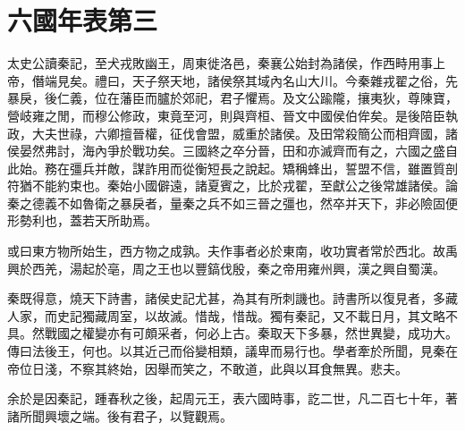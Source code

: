 \onecolumn
\chapter{六國年表第三}

太史公讀秦記，至犬戎敗幽王，周東徙洛邑，秦襄公始封為諸侯，作西畤用事上帝，僭端見矣。禮曰，天子祭天地，諸侯祭其域內名山大川。今秦雜戎翟之俗，先暴戾，後仁義，位在藩臣而臚於郊祀，君子懼焉。及文公踰隴，攘夷狄，尊陳寶，營岐雍之閒，而穆公修政，東竟至河，則與齊桓、晉文中國侯伯侔矣。是後陪臣執政，大夫世祿，六卿擅晉權，征伐會盟，威重於諸侯。及田常殺簡公而相齊國，諸侯晏然弗討，海內爭於戰功矣。三國終之卒分晉，田和亦滅齊而有之，六國之盛自此始。務在彊兵并敵，謀詐用而從衡短長之說起。矯稱蜂出，誓盟不信，雖置質剖符猶不能約束也。秦始小國僻遠，諸夏賓之，比於戎翟，至獻公之後常雄諸侯。論秦之德義不如魯衛之暴戾者，量秦之兵不如三晉之彊也，然卒并天下，非必險固便形勢利也，蓋若天所助焉。
	
或曰東方物所始生，西方物之成孰。夫作事者必於東南，收功實者常於西北。故禹興於西羌，湯起於亳，周之王也以豐鎬伐殷，秦之帝用雍州興，漢之興自蜀漢。

秦既得意，燒天下詩書，諸侯史記尤甚，為其有所刺譏也。詩書所以復見者，多藏人家，而史記獨藏周室，以故滅。惜哉，惜哉。獨有秦記，又不載日月，其文略不具。然戰國之權變亦有可頗采者，何必上古。秦取天下多暴，然世異變，成功大。傳曰法後王，何也。以其近己而俗變相類，議卑而易行也。學者牽於所聞，見秦在帝位日淺，不察其終始，因舉而笑之，不敢道，此與以耳食無異。悲夫。

余於是因秦記，踵春秋之後，起周元王，表六國時事，訖二世，凡二百七十年，著諸所聞興壞之端。後有君子，以覽觀焉。

